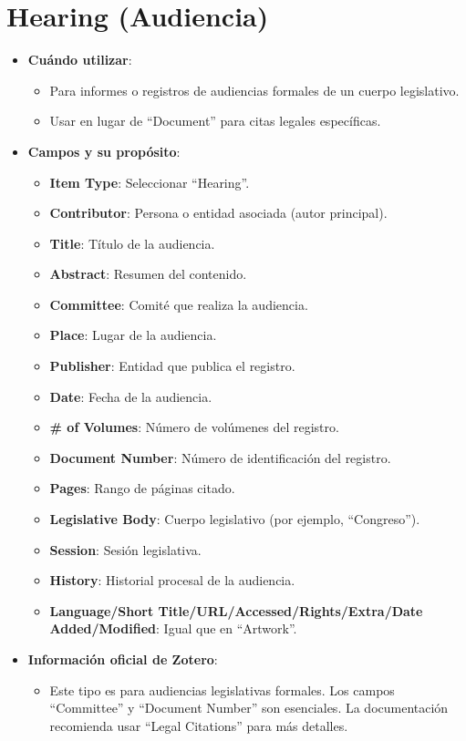 \documentclass[
  jou,
  floatsintext,
  longtable,
  a4paper,
  nolmodern,
  notxfonts,
  notimes,
  12pt,
  colorlinks=true,linkcolor=blue,citecolor=blue,urlcolor=blue]{apa7}
\providecommand{\tightlist}{%
  \setlength{\itemsep}{0pt}\setlength{\parskip}{0pt}}
\begin{document}
\section{Hearing (Audiencia)}\label{hearing-audiencia}

\begin{itemize}
\tightlist
\item
  \textbf{Cuándo utilizar}:

  \begin{itemize}
  \tightlist
  \item
    Para informes o registros de audiencias formales de un cuerpo
    legislativo.
  \item
    Usar en lugar de ``Document'' para citas legales específicas.
  \end{itemize}
\item
  \textbf{Campos y su propósito}:

  \begin{itemize}
  \tightlist
  \item
    \textbf{Item Type}: Seleccionar ``Hearing''.
  \item
    \textbf{Contributor}: Persona o entidad asociada (autor principal).
  \item
    \textbf{Title}: Título de la audiencia.
  \item
    \textbf{Abstract}: Resumen del contenido.
  \item
    \textbf{Committee}: Comité que realiza la audiencia.
  \item
    \textbf{Place}: Lugar de la audiencia.
  \item
    \textbf{Publisher}: Entidad que publica el registro.
  \item
    \textbf{Date}: Fecha de la audiencia.
  \item
    \textbf{\# of Volumes}: Número de volúmenes del registro.
  \item
    \textbf{Document Number}: Número de identificación del registro.
  \item
    \textbf{Pages}: Rango de páginas citado.
  \item
    \textbf{Legislative Body}: Cuerpo legislativo (por ejemplo,
    ``Congreso'').
  \item
    \textbf{Session}: Sesión legislativa.
  \item
    \textbf{History}: Historial procesal de la audiencia.
  \item
    \textbf{Language/Short Title/URL/Accessed/Rights/Extra/Date
    Added/Modified}: Igual que en ``Artwork''.
  \end{itemize}
\item
  \textbf{Información oficial de Zotero}:

  \begin{itemize}
  \tightlist
  \item
    Este tipo es para audiencias legislativas formales. Los campos
    ``Committee'' y ``Document Number'' son esenciales. La documentación
    recomienda usar ``Legal Citations'' para más detalles.
  \end{itemize}
\end{itemize}
\end{document}
